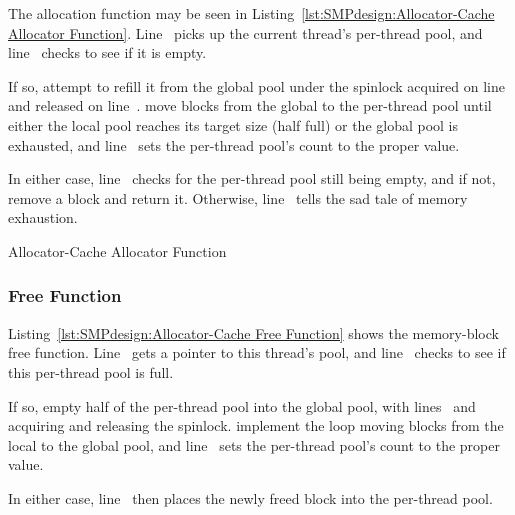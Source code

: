\begin{fcvref}
The allocation function  may be seen in
Listing~\ref{lst:SMPdesign:Allocator-Cache Allocator Function}.
Line~ picks up the current thread's per-thread pool,
and line~ checks to see if it is empty.

If so,  attempt to refill it
from the global pool
under the spinlock acquired on line~ and released on line~.
 move blocks from the global
to the per-thread pool until
either the local pool reaches its target size (half full) or
the global pool is exhausted, and line~ sets the per-thread pool's
count to the proper value.

In either case, line~ checks for the per-thread
pool still being
empty, and if not,  remove a block and return it.
Otherwise, line~ tells the sad tale of memory exhaustion.
\end{fcvref}

\begin{listing}[tbp]

\caption{Allocator-Cache Allocator Function}
\label{lst:SMPdesign:Allocator-Cache Allocator Function}
\end{listing}

\subsubsection{Free Function}

\begin{fcvref}
Listing~\ref{lst:SMPdesign:Allocator-Cache Free Function} shows
the memory-block free function.
Line~ gets a pointer to this thread's pool, and
line~ checks to see if this per-thread pool is full.

If so,  empty half of the per-thread pool
into the global pool,
with lines~ and~ acquiring and releasing the spinlock.
 implement the loop moving blocks
from the local to the
global pool, and line~ sets the per-thread pool's count to the proper
value.

In either case, line~ then places the newly freed block into the
per-thread pool.
\end{fcvref}

